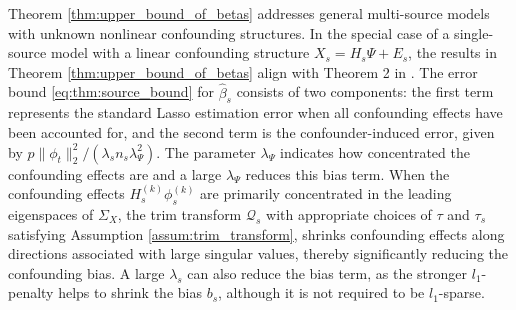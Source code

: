 \documentclass[12pt]{article}
\newcommand{\change}[1]{\textcolor{blue}{#1}}
\begin{document}

Theorem \ref{thm:upper_bound_of_betas} addresses general multi-source models with unknown nonlinear confounding structures. In the special case of a single-source model with a linear confounding structure $X_s = H_s\Psi +E_s$, the results in Theorem \ref{thm:upper_bound_of_betas} align with Theorem 2 in \cite{cevid2020spectral}. The error bound \eqref{eq:thm:source_bound} for $\hat{\beta}_s$ consists of two components: the first term represents the standard Lasso estimation error when all confounding effects have been accounted for, and the second term is the confounder-induced error, given by $p\|\phi_t\|_2^2/(\lambda_s n_s \lambda_\Psi^2)$. The parameter $\lambda_\Psi$ indicates how concentrated the confounding effects are and a large $\lambda_\Psi$ reduces this bias term. When the confounding effects $H_s^{(k)}\phi_s^{(k)}$ are primarily concentrated in the leading eigenspaces of $\Sigma_X$, the trim transform $\mathcal{Q}_s$ with appropriate choices of $\tau$ and $\tau_s$ satisfying Assumption \ref{assum:trim_transform}, shrinks confounding effects along directions associated with large singular values, thereby significantly reducing the confounding bias. A large $\lambda_s$ can also reduce the bias term, as the stronger $l_1$-penalty helps to shrink the bias $b_s$, although it is not required to be $l_1$-sparse. 

\end{document}
